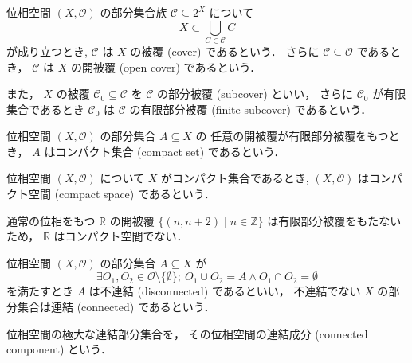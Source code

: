 \documentclass[titlepage]{ltjsreport}
\newtheorem[S]{theorem}{定理}[chapter]
\newtheorem[S]{definition}[theorem]{定義}
\newtheorem[S]{example}[theorem]{例}
\begin{document}
\begin{definition}
  位相空間 $(X,\mathcal{O})$ の部分集合族 $\mathcal{C}\subseteq2^X$ について
  \begin{equation}
    X\subset\bigcup_{C\in\mathcal{C}}C
  \end{equation}
  が成り立つとき,
  $\mathcal{C}$ は $X$ の被覆 (cover) であるという．
  さらに $\mathcal{C}\subseteq\mathcal{O}$ であるとき，
  $\mathcal{C}$ は $X$ の開被覆 (open cover) であるという．

  また，
  $X$ の被覆 $\mathcal{C}_0\subseteq\mathcal{C}$ を
  $\mathcal{C}$ の部分被覆 (subcover) といい，
  さらに $\mathcal{C}_0$ が有限集合であるとき
  $\mathcal{C}_0$ は $\mathcal{C}$ の有限部分被覆 (finite subcover) であるという．
\end{definition}

\begin{definition}[コンパクト集合]
  位相空間 $(X,\mathcal{O})$ の部分集合 $A\subseteq X$ の
  任意の開被覆が有限部分被覆をもつとき，
  $A$ はコンパクト集合 (compact set) であるという．
\end{definition}

\begin{definition}[コンパクト空間]
  位相空間 $(X,\mathcal{O})$ について $X$ がコンパクト集合であるとき,
  $(X,\mathcal{O})$ はコンパクト空間 (compact space) であるという．
\end{definition}

\begin{example}
  通常の位相をもつ
  $\mathbb{R}$
  の開被覆
  $\{(n,n+2)\mid n\in\mathbb{Z}\}$
  は有限部分被覆をもたないため，
  $\mathbb{R}$
  はコンパクト空間でない．
\end{example}

\begin{definition}[連結，不連結]
  位相空間 $(X,\mathcal{O})$ の部分集合 $A\subseteq X$ が
  \begin{equation}
    \exists O_1,O_2\in\mathcal{O}\setminus\{\emptyset\};
    \ O_1\cup O_2=A\wedge O_1\cap O_2=\emptyset
  \end{equation}
  を満たすとき $A$ は不連結 (disconnected) であるといい，
  不連結でない $X$ の部分集合は連結 (connected) であるという．
\end{definition}

\begin{definition}[連結成分]
  位相空間の極大な連結部分集合を，
  その位相空間の連結成分 (connected component) という．
\end{definition}
\end{document}
